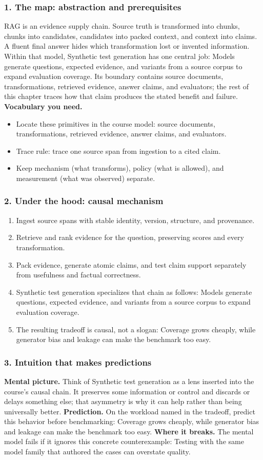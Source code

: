 \subsubsection*{1. The map: abstraction and prerequisites}
RAG is an evidence supply chain. Source truth is transformed into chunks, chunks into candidates, candidates into packed context, and context into claims. A fluent final answer hides which transformation lost or invented information.
Within that model, Synthetic test generation has one central job: Models generate questions, expected evidence, and variants from a source corpus to expand evaluation coverage. Its boundary contains source documents, transformations, retrieved evidence, answer claims, and evaluators; the rest of this chapter traces how that claim produces the stated benefit and failure.
\textbf{Vocabulary you need.}\begin{itemize}
\item Locate these primitives in the course model: source documents, transformations, retrieved evidence, answer claims, and evaluators.
\item Trace rule: trace one source span from ingestion to a cited claim.
\item Keep mechanism (what transforms), policy (what is allowed), and measurement (what was observed) separate.
\end{itemize}
\subsubsection*{2. Under the hood: causal mechanism}\begin{enumerate}
\item Ingest source spans with stable identity, version, structure, and provenance.
\item Retrieve and rank evidence for the question, preserving scores and every transformation.
\item Pack evidence, generate atomic claims, and test claim support separately from usefulness and factual correctness.
\item Synthetic test generation specializes that chain as follows: Models generate questions, expected evidence, and variants from a source corpus to expand evaluation coverage.
\item The resulting tradeoff is causal, not a slogan: Coverage grows cheaply, while generator bias and leakage can make the benchmark too easy.
\end{enumerate}
\subsubsection*{3. Intuition that makes predictions}
\textbf{Mental picture.} Think of Synthetic test generation as a lens inserted into the course's causal chain. It preserves some information or control and discards or delays something else; that asymmetry is why it can help rather than being universally better.
\textbf{Prediction.} On the workload named in the tradeoff, predict this behavior before benchmarking: Coverage grows cheaply, while generator bias and leakage can make the benchmark too easy.
\textbf{Where it breaks.} The mental model fails if it ignores this concrete counterexample: Testing with the same model family that authored the cases can overstate quality.
